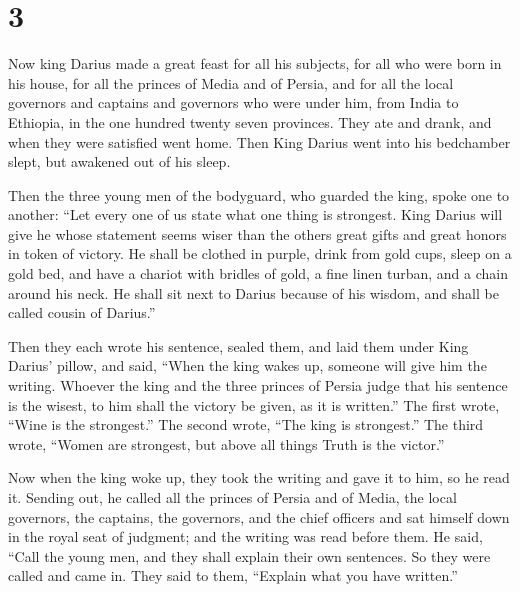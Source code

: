 \hypertarget{section-2}{%
\section{3}\label{section-2}}

 Now king Darius made a great feast for all his subjects,
for all who were born in his house, for all the princes of Media and of
Persia,  and for all the local governors and captains and
governors who were under him, from India to Ethiopia, in the one hundred
twenty seven provinces.  They ate and drank, and when they
were satisfied went home. Then King Darius went into his bedchamber
slept, but awakened out of his sleep.

 Then the three young men of the bodyguard, who guarded the
king, spoke one to another:  ``Let every one of us state
what one thing is strongest. King Darius will give he whose statement
seems wiser than the others great gifts and great honors in token of
victory.  He shall be clothed in purple, drink from gold
cups, sleep on a gold bed, and have a chariot with bridles of gold, a
fine linen turban, and a chain around his neck.  He shall
sit next to Darius because of his wisdom, and shall be called cousin of
Darius.''

 Then they each wrote his sentence, sealed them, and laid
them under King Darius' pillow,  and said, ``When the king
wakes up, someone will give him the writing. Whoever the king and the
three princes of Persia judge that his sentence is the wisest, to him
shall the victory be given, as it is written.''  The first
wrote, ``Wine is the strongest.''  The second wrote, ``The
king is strongest.''  The third wrote, ``Women are
strongest, but above all things Truth is the victor.''

 Now when the king woke up, they took the writing and gave
it to him, so he read it.  Sending out, he called all the
princes of Persia and of Media, the local governors, the captains, the
governors, and the chief officers  and sat himself down in
the royal seat of judgment; and the writing was read before them.
 He said, ``Call the young men, and they shall explain
their own sentences. So they were called and came in.  They
said to them, ``Explain what you have written.''

